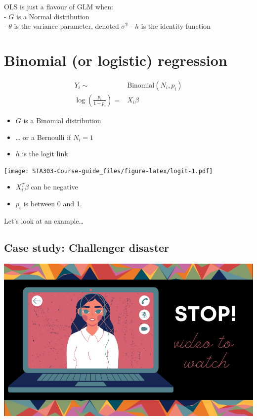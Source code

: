 \documentclass[
  openany]{book}
\providecommand{\tightlist}{%
  \setlength{\itemsep}{0pt}\setlength{\parskip}{0pt}}
\begin{document}
OLS is just a flavour of GLM when:\\
- \(G\) is a Normal distribution\\
- \(\theta\) is the variance parameter, denoted \(\sigma^2\) - \(h\) is the
identity function

\hypertarget{binomial-or-logistic-regression}{%
\section{Binomial (or logistic) regression}\label{binomial-or-logistic-regression}}

\begin{align*}
Y_i \sim & \text{Binomial}(N_i, p_i)\\
\log\left(\frac{p_i}{1-p_i}\right) = & X_i \beta
\end{align*}

\begin{itemize}
\tightlist
\item
  \(G\) is a Binomial distribution
\item
  \ldots{} or a Bernoulli if \(N_i=1\)
\item
  \(h\) is the logit link
\end{itemize}

\texttt{[image: STA303-Course-guide\_files/figure-latex/logit-1.pdf]}

\begin{itemize}
\tightlist
\item
  \(X_i^T \beta\) can be negative
\item
  \(p_i\) is between 0 and 1.
\end{itemize}

Let's look at an example\ldots{}

\hypertarget{case-study-challenger-disaster}{%
\subsection{Case study: Challenger disaster}\label{case-study-challenger-disaster}}

\begin{center}\includegraphics[width=0.6\linewidth]{images/stop-video} \end{center}
\end{document}
